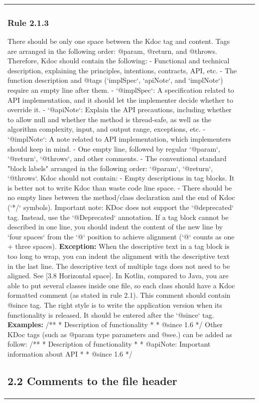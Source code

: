 \begin{center}
\begin{tabular}{ |p{}|p{}|p{}| }
\subsubsection*{\textbf{Rule 2.1.3}}
There should be only one space between the Kdoc tag and content. Tags are arranged in the following order: @param, @return, and @throws.
Therefore, Kdoc should contain the following:
- Functional and technical description, explaining the principles, intentions, contracts, API, etc.
- The function description and @tags (`implSpec`, `apiNote`, and `implNote`) require an empty line after them.
- `@implSpec`: A specification related to API implementation, and it should let the implementer decide whether to override it.
- `@apiNote`: Explain the API precautions, including whether to allow null and whether the method is thread-safe, as well as the algorithm complexity, input, and output range, exceptions, etc.
- `@implNote`: A note related to API implementation, which implementers should keep in mind.
- One empty line, followed by regular `@param`, `@return`, `@throws`, and other comments.
- The conventional standard "block labels" arranged in the following order: `@param`, `@return`, `@throws`.
Kdoc should not contain:
- Empty descriptions in tag blocks. It is better not to write Kdoc than waste code line space.
- There should be no empty lines between the method/class declaration and the end of Kdoc (`*/` symbols).
Important note: KDoc does not support the `@deprecated` tag. Instead, use the `@Deprecated` annotation.
If a tag block cannot be described in one line, you should indent the content of the new line by `four spaces` from the `@` position to achieve alignment (`@` counts as one + three spaces).
\textbf{Exception:} When the descriptive text in a tag block is too long to wrap, you can indent the alignment with the descriptive text in the last line. The descriptive text of multiple tags does not need to be aligned.
See [3.8 Horizontal space].
In Kotlin, compared to Java, you are able to put several classes inside one file, so each class should have a Kdoc formatted comment (as stated in rule 2.1).
This comment should contain @since tag. The right style is to write the application version when its functionality is released. It should be entered after the `@since` tag.
\textbf{Examples:}
/**
 * Description of functionality
 *
 * @since 1.6
 */
Other KDoc tags (such as @param type parameters and @see.) can be added as follow:
/**
 * Description of functionality
 *
 * @apiNote: Important information about API
 *
 * @since 1.6
 */
\subsection*{\textbf{2.2 Comments to the file header}}

\end{tabular}
\end{center}
